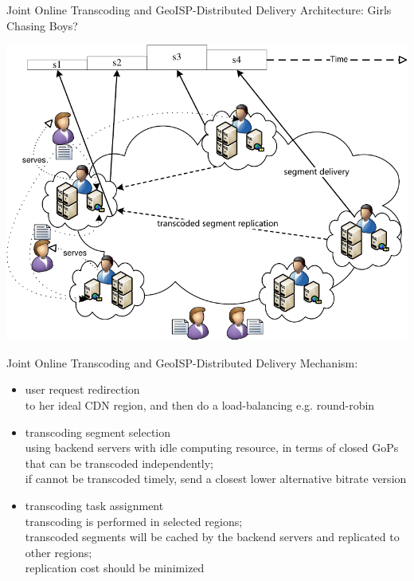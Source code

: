 \documentclass{beamer}
\begin{document}
\begin{frame}{Joint Online Transcoding and GeoISP-Distributed Delivery}
	Architecture: Girls Chasing Boys?
	\begin{center}
		\includegraphics[width=0.8\linewidth]{fig/transcoding_delivery.pdf}
	\end{center}
\end{frame}

\begin{frame}{Joint Online Transcoding and GeoISP-Distributed Delivery}
	Mechanism:
	\begin{itemize}
		\item<1> user request redirection\\
		to her ideal CDN region, and then do a load-balancing e.g. round-robin
		\item<1> transcoding segment selection\\
		using backend servers with idle computing resource, in terms of closed GoPs that can be transcoded independently;\\
		if cannot be transcoded timely, send a closest lower alternative bitrate version 
		\item<1> transcoding task assignment\\
		transcoding is performed in selected regions;\\
		transcoded segments will be cached by the backend servers and replicated to other regions;\\
		replication cost should be minimized		
	\end{itemize}
\end{frame}
\end{document}
